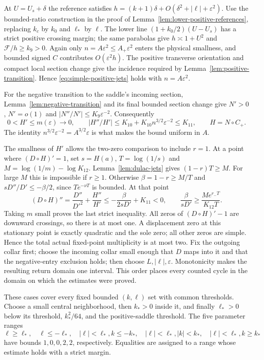At $U=U_s+\delta$ the reference satisfies
$h=(k+1)\delta+O(\delta^2+|\ell|+\varepsilon^2)$.
Use the bounded-ratio construction in the proof of
Lemma~\ref{lem:lower-positive-references}, replacing $k_c$ by $k_0$
and $\ell_*$ by $\ell$. The lower line
$(1+k_0/2)(U-U_s)$ has a strict positive crossing margin; the same
parabolas give $h\asymp1+U^2$ and $\mathcal F/h\ge k_9>0$.
Again only $n=A\varepsilon^2\le A_+\varepsilon^2$ enters the physical
smallness, and bounded signed $C$ contributes $O(\varepsilon^2h)$.
The positive transverse orientation and compact local section change
give the incidence required by Lemma~\ref{lem:positive-transition}.
Hence \eqref{eq:simple-positive-jets} holds with $n=A\varepsilon^2$.

For the negative transition to the saddle's incoming section,
Lemma~\ref{lem:negative-transition} and its final bounded section
change give $N'>0$, $N'=o(1)$ and $|N''/N'|\le K_9\varepsilon^{-2}$.
Consequently
\begin{equation}\label{eq:simple-compact-complement}
 0<H'\le m(\varepsilon)\longrightarrow0,\qquad
 |H''/H'|\le K_{10}+K_{10}n^{3/2}\varepsilon^{-2}
             \le K_{11},\qquad H=N\circ C_+.
\end{equation}
The identity $n^{3/2}\varepsilon^{-2}=A^{3/2}\varepsilon$ is what
makes the bound uniform in $A$.

The smallness of $H'$ allows the two-zero comparison to include $r=1$.
At a point where $(D\circ H)'=1$, set
$s=H(a)$, $T=\log(1/s)$ and $M=\log(1/m)-\log K_{12}$.
Lemma~\ref{lem:dulac-jets} gives
$(1-r)T\ge M$.  For large $M$ this is impossible if $r\ge1$.
Otherwise $\beta=1-r\ge M/T$ and
$sD''/D'\le-\beta/2$, since $T e^{-\nu T}$ is bounded.
At that point
\[
 (D\circ H)''=\frac{D''}{D'^2}+\frac{H''}{H'}
 \le-\frac{\beta}{2sD'}+K_{11}<0,\qquad
 \frac{\beta}{sD'}\ge\frac{M e^{r_-T}}{K_{12}T}.
\]
Taking $m$ small proves the last strict inequality.
All zeros of $(D\circ H)'-1$ are downward crossings, so there is at
most one. A displacement zero at this stationary point is exactly
quadratic and the sole zero; all other zeros are simple. Hence the
total actual fixed-point multiplicity is at most two.
Fix the outgoing collar first; choose the incoming collar small enough
that $D$ maps into it and that the negative-entry exclusion holds;
then choose $L,|\ell|,\varepsilon$.  Monotonicity makes the resulting
return domain one interval.  This order places every counted cycle
in the domain on which the estimates were proved.

These cases cover every fixed bounded $(k,\ell)$ set with common
thresholds. Choose a small central neighborhood, then $k_*>0$
inside it, and finally $\ell_*>0$ below its threshold, $k_*^2/64$,
and the positive-saddle threshold.  The five parameter ranges
\[
 \ell\ge\ell_*,\quad \ell\le-\ell_*,\quad
 |\ell|<\ell_*, k\le-k_*,\quad
 |\ell|<\ell_*, |k|<k_*,\quad
 |\ell|<\ell_*, k\ge k_*
\]
have bounds $1,0,0,2,2$, respectively.  Equalities are assigned to a
range whose estimate holds with a strict margin.

